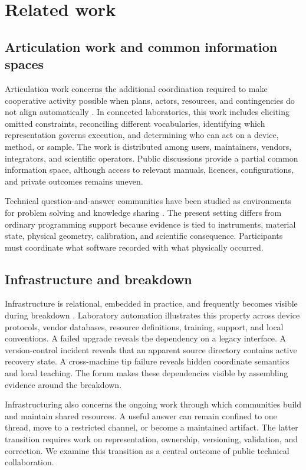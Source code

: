 \section{Related work}

\subsection{Articulation work and common information spaces}

Articulation work concerns the additional coordination required to make cooperative activity possible when plans, actors, resources, and contingencies do not align automatically \cite{schmidt1992articulation}. In connected laboratories, this work includes eliciting omitted constraints, reconciling different vocabularies, identifying which representation governs execution, and determining who can act on a device, method, or sample. The work is distributed among users, maintainers, vendors, integrators, and scientific operators. Public discussions provide a partial common information space, although access to relevant manuals, licences, configurations, and private outcomes remains uneven.

Technical question-and-answer communities have been studied as environments for problem solving and knowledge sharing \cite{treude2011questions,vasilescu2014social}. The present setting differs from ordinary programming support because evidence is tied to instruments, material state, physical geometry, calibration, and scientific consequence. Participants must coordinate what software recorded with what physically occurred.

\subsection{Infrastructure and breakdown}

Infrastructure is relational, embedded in practice, and frequently becomes visible during breakdown \cite{star1996infrastructure}. Laboratory automation illustrates this property across device protocols, vendor databases, resource definitions, training, support, and local conventions. A failed upgrade reveals the dependency on a legacy interface. A version-control incident reveals that an apparent source directory contains active recovery state. A cross-machine tip failure reveals hidden coordinate semantics and local teaching. The forum makes these dependencies visible by assembling evidence around the breakdown.

Infrastructuring also concerns the ongoing work through which communities build and maintain shared resources. A useful answer can remain confined to one thread, move to a restricted channel, or become a maintained artifact. The latter transition requires work on representation, ownership, versioning, validation, and correction. We examine this transition as a central outcome of public technical collaboration.

